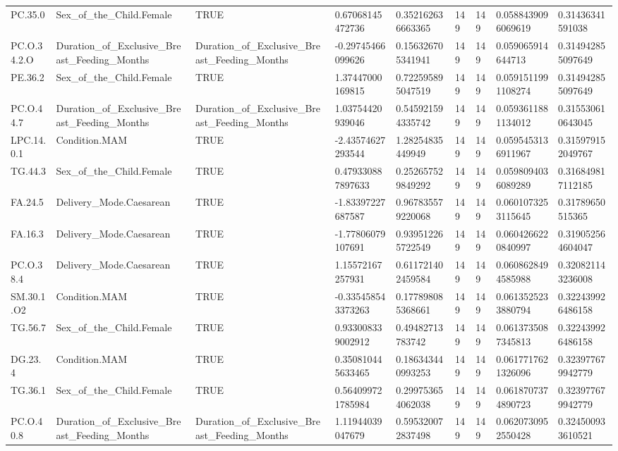 \begin{longtable}{lllllllll}
PC.35.0 & Sex\_of\_the\_Child.Female & TRUE & 0.67068145472736 & 0.352162636663365 & 149 & 149 & 0.0588439096069619 & 0.31436341591038 \\
PC.O.34.2.O & Duration\_of\_Exclusive\_Breast\_Feeding\_Months & Duration\_of\_Exclusive\_Breast\_Feeding\_Months & -0.29745466099626 & 0.156326705341941 & 149 & 149 & 0.059065914644713 & 0.314942855097649 \\
PE.36.2 & Sex\_of\_the\_Child.Female & TRUE & 1.37447000169815 & 0.722595895047519 & 149 & 149 & 0.0591511991108274 & 0.314942855097649 \\
PC.O.44.7 & Duration\_of\_Exclusive\_Breast\_Feeding\_Months & Duration\_of\_Exclusive\_Breast\_Feeding\_Months & 1.03754420939046 & 0.545921594335742 & 149 & 149 & 0.0593611881134012 & 0.315530610643045 \\
LPC.14.0.1 & Condition.MAM & TRUE & -2.43574627293544 & 1.28254835449949 & 149 & 149 & 0.0595453136911967 & 0.315979152049767 \\
TG.44.3 & Sex\_of\_the\_Child.Female & TRUE & 0.479330887897633 & 0.252657529849292 & 149 & 149 & 0.0598094036089289 & 0.316849817112185 \\
FA.24.5 & Delivery\_Mode.Caesarean & TRUE & -1.83397227687587 & 0.967835579220068 & 149 & 149 & 0.0601073253115645 & 0.31789650515365 \\
FA.16.3 & Delivery\_Mode.Caesarean & TRUE & -1.77806079107691 & 0.939512265722549 & 149 & 149 & 0.0604266220840997 & 0.319052564604047 \\
PC.O.38.4 & Delivery\_Mode.Caesarean & TRUE & 1.15572167257931 & 0.611721402459584 & 149 & 149 & 0.0608628494585988 & 0.320821143236008 \\
SM.30.1.O2 & Condition.MAM & TRUE & -0.335458543373263 & 0.177898085368661 & 149 & 149 & 0.0613525233880794 & 0.322439926486158 \\
TG.56.7 & Sex\_of\_the\_Child.Female & TRUE & 0.933008339002912 & 0.49482713783742 & 149 & 149 & 0.0613735087345813 & 0.322439926486158 \\
DG.23.4 & Condition.MAM & TRUE & 0.350810445633465 & 0.186343440993253 & 149 & 149 & 0.0617717621326096 & 0.323977679942779 \\
TG.36.1 & Sex\_of\_the\_Child.Female & TRUE & 0.564099721785984 & 0.299753654062038 & 149 & 149 & 0.0618707374890723 & 0.323977679942779 \\
PC.O.40.8 & Duration\_of\_Exclusive\_Breast\_Feeding\_Months & Duration\_of\_Exclusive\_Breast\_Feeding\_Months & 1.11944039047679 & 0.595320072837498 & 149 & 149 & 0.0620730952550428 & 0.324500933610521 \\

\end{longtable}
